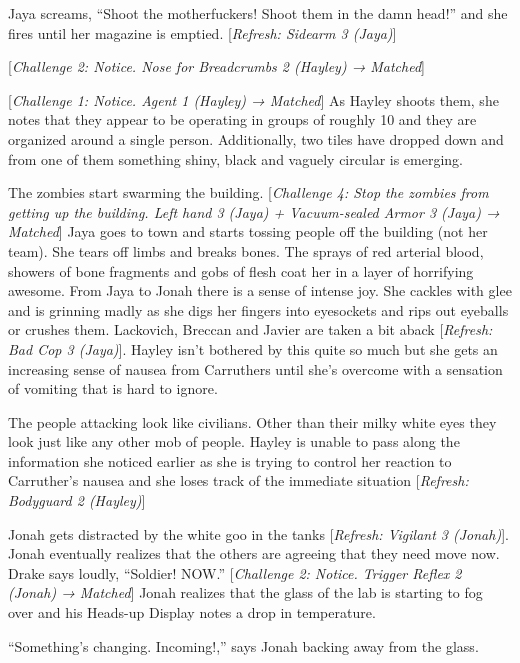 Jaya screams, ``Shoot the motherfuckers!  Shoot them in the damn head!'' and she fires until her magazine is emptied.  {[}\textit{Refresh: Sidearm 3 (Jaya)}{]}

{[}\textit{Challenge 2: Notice.  Nose for Breadcrumbs 2 (Hayley) → Matched}{]}

{[}\textit{Challenge 1: Notice. Agent 1 (Hayley) → Matched}{]}  As Hayley shoots them, she notes that they appear to be operating in groups of roughly 10 and they are organized around a single person.  Additionally, two tiles have dropped down and from one of them something shiny, black and vaguely circular is emerging.

The zombies start swarming the building.  {[}\textit{Challenge 4: Stop the zombies from getting up the building.  Left hand 3 (Jaya) + Vacuum-sealed Armor 3 (Jaya) → Matched}{]}  Jaya goes to town and starts tossing people off the building (not her team).  She tears off limbs and breaks bones.  The sprays of red arterial blood, showers of bone fragments and gobs of flesh coat her in a layer of horrifying awesome.  From Jaya to Jonah there is a sense of intense joy.  She cackles with glee and is grinning madly as she digs her fingers into eyesockets and rips out eyeballs or crushes them.  Lackovich, Breccan and Javier are taken a bit aback {[}\textit{Refresh: Bad Cop 3 (Jaya)}{]}.  Hayley isn't bothered by this quite so much but she gets an increasing sense of nausea from Carruthers until she's overcome with a sensation of vomiting that is hard to ignore.



The people attacking look like civilians.  Other than their milky white eyes they look just like any other mob of people.  Hayley is unable to pass along the information she noticed earlier as she is trying to control her reaction to Carruther's nausea and she loses track of the immediate situation {[}\textit{Refresh: Bodyguard 2 (Hayley)}{]}





Jonah gets distracted by the white goo in the tanks {[}\textit{Refresh: Vigilant 3 (Jonah)}{]}.  Jonah eventually realizes that the others are agreeing that they need move now.  Drake says loudly, ``Soldier!  NOW.''  {[}\textit{Challenge 2: Notice. Trigger Reflex 2 (Jonah) → Matched}{]}  Jonah realizes that the glass of the lab is starting to fog over and his Heads-up Display notes a drop in temperature.

``Something's changing.  Incoming!,'' says Jonah backing away from the glass.


